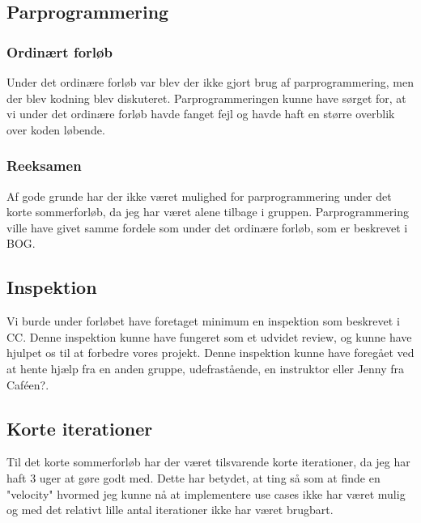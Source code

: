 \documentclass[]{article}
\begin{document}
\subsection{Parprogrammering}
\subsubsection{Ordinært forløb}
Under det ordinære forløb var blev der ikke gjort brug af parprogrammering, men der blev kodning blev diskuteret. Parprogrammeringen kunne have sørget for, at vi under det ordinære forløb havde fanget fejl og havde haft en større overblik over koden løbende. \\
\subsubsection{Reeksamen}
Af gode grunde har der ikke været mulighed for parprogrammering under det korte sommerforløb, da jeg har været alene tilbage i gruppen. Parprogrammering ville have givet samme fordele som under det ordinære forløb, som er beskrevet i BOG.
\subsection{Inspektion}
Vi burde under forløbet have foretaget minimum en inspektion som beskrevet i CC. Denne inspektion kunne have fungeret som et udvidet review, og kunne have hjulpet os til at forbedre vores projekt. Denne inspektion kunne have foregået ved at hente hjælp fra en anden gruppe, udefrastående, en instruktor eller Jenny fra Caféen?.
\subsection{Korte iterationer}
Til det korte sommerforløb har der været tilsvarende korte iterationer, da jeg har haft 3 uger at gøre godt med. Dette har betydet, at ting så som at finde en "velocity" hvormed jeg kunne nå at implementere use cases ikke har været mulig og med det relativt lille antal iterationer ikke har været brugbart.

\pagebreak[3]


\newpage  %
\thispagestyle{empty}
\end{document}

